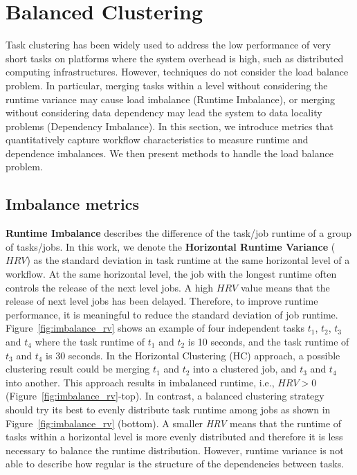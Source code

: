 \section{Balanced Clustering}
\label{sec:imbalance}

Task clustering has been widely used to address the low performance of very short tasks on platforms where the system overhead is high, such as distributed computing infrastructures. However, techniques do not consider the load balance problem. In particular, merging tasks within a level without considering the runtime variance may cause load imbalance (Runtime Imbalance), or merging without considering data dependency may lead the system to data locality problems (Dependency Imbalance). In this section, we introduce metrics that quantitatively capture workflow characteristics to measure runtime and dependence imbalances. We then present methods to handle the load balance problem.


\subsection{Imbalance metrics}

\textbf{Runtime Imbalance} describes the difference of the task/job runtime of a group of tasks/jobs. In this work, we denote the \textbf{Horizontal Runtime Variance} ($HRV$) as the standard deviation in task runtime at the same horizontal level of a workflow. At the same horizontal level, the job with the longest runtime often controls the release of the next level jobs. A high $HRV$ value means that the release of next level jobs has been delayed. Therefore, to improve runtime performance, it is meaningful to reduce the standard deviation of job runtime. Figure~\ref{fig:imbalance_rv} shows an example of four independent tasks $t_1$, $t_2$, $t_3$ and $t_4$ where the task runtime of $t_1$ and $t_2$ is 10 seconds, and the task runtime of $t_3$ and $t_4$ is 30 seconds. In the Horizontal Clustering (HC) approach, a possible clustering result could be merging $t_1$ and $t_2$ into a clustered job, and $t_3$ and $t_4$ into another. This approach results in imbalanced runtime, i.e., $HRV > 0$ (Figure~\ref{fig:imbalance_rv}-top). In contrast, a balanced clustering strategy should try its best to evenly distribute task runtime among jobs as shown in Figure~\ref{fig:imbalance_rv} (bottom). A smaller \emph{HRV} means that the runtime of tasks within a horizontal level is more evenly distributed and therefore it is less necessary to balance the runtime distribution. However, runtime variance is not able to describe how regular is the structure of the dependencies between tasks.

